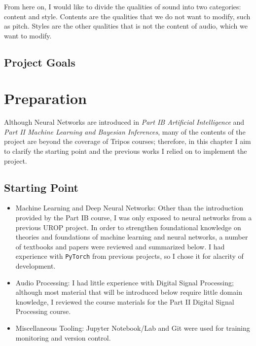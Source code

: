 \documentclass[12pt,a4paper,]{report}
\begin{document}
From here on, I would like to divide the qualities of sound into two
categories: content and style. Contents are the qualities that we do not
want to modify, such as pitch. Styles are the other qualities that is
not the content of audio, which we want to modify.

\hypertarget{project-goals}{%
\section{Project Goals}\label{project-goals}}

\hypertarget{preparation}{%
\chapter{Preparation}\label{preparation}}

Although Neural Networks are introduced in \emph{Part IB Artificial
Intelligence} and \emph{Part II Machine Learning and Bayesian
Inferences}, many of the contents of the project are beyond the coverage
of Tripos courses; therefore, in this chapter I aim to clarify the
starting point and the previous works I relied on to implement the
project.

\hypertarget{starting-point}{%
\section{Starting Point}\label{starting-point}}

\begin{itemize}
\item
  Machine Learning and Deep Neural Networks: Other than the introduction
  provided by the Part IB course, I was only exposed to neural networks
  from a previous UROP project. In order to strengthen foundational
  knowledge on theories and foundations of machine learning and neural
  networks, a number of textbooks and papers were reviewed and
  summarized below. I had experience with \texttt{PyTorch} from previous
  projects, so I chose it for alacrity of development.
\item
  Audio Processing: I had little experience with Digital Signal
  Processing; although most material that will be introduced below
  require little domain knowledge, I reviewed the course materials for
  the Part II Digital Signal Processing course.
\item
  Miscellaneous Tooling: Jupyter Notebook/Lab and Git were used for
  training monitoring and version control.
\end{itemize}
\end{document}
